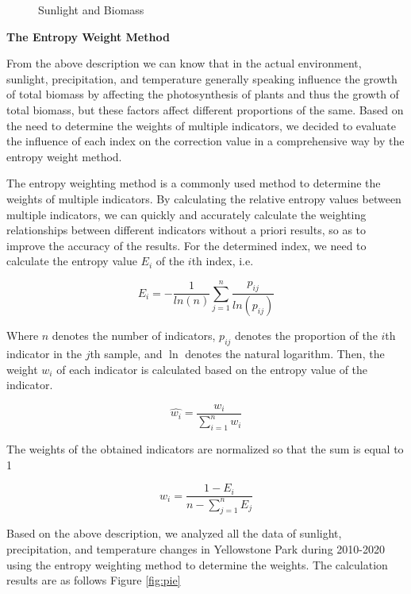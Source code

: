 \documentclass[12pt]{article}
\begin{document}
\begin{figure}[htb]
	\centering
	
	\caption{Sunlight and Biomass}
	\label{fig:sunlight}
\end{figure}

\vspace{0.5cm}

\textbf{The Entropy Weight Method}

\vspace{0.5cm}

From the above description we can know that in the actual environment, sunlight, precipitation, and temperature generally speaking influence the growth of total biomass by affecting the photosynthesis of plants and thus the growth of total biomass, but these factors affect different proportions of the same. Based on the need to determine the weights of multiple indicators, we decided to evaluate the influence of each index on the correction value in a comprehensive way by the entropy weight method.

The entropy weighting method is a commonly used method to determine the weights of multiple indicators. By calculating the relative entropy values between multiple indicators, we can quickly and accurately calculate the weighting relationships between different indicators without a priori results, so as to improve the accuracy of the results. For the determined index, we need to calculate the entropy value $E_i$ of the $i$th index, i.e.

\begin{equation}
	E_i = - \frac{1}{ln(n)} \sum_{j=1}^n \frac{p_{ij}}{ln(p_{ij})}
\end{equation}

Where $n$ denotes the number of indicators, $p_{ij}$ denotes the proportion of the $i$th indicator in the $j$th sample, and $\ln$ denotes the natural logarithm. Then, the weight $w_i$ of each indicator is calculated based on the entropy value of the indicator.

\begin{equation}
	\hat{w_i} = \frac{w_i}{\sum^n_{i=1}w_i}
\end{equation}

The weights of the obtained indicators are normalized so that the sum is equal to 1

\begin{equation}
	w_i = \frac{1 - E_i}{n - \sum^n_{j=1} E_j}
\end{equation}

Based on the above description, we analyzed all the data of sunlight, precipitation, and temperature changes in Yellowstone Park during 2010-2020 using the entropy weighting method to determine the weights. The calculation results are as follows Figure \ref{fig:pie}
\end{document}
